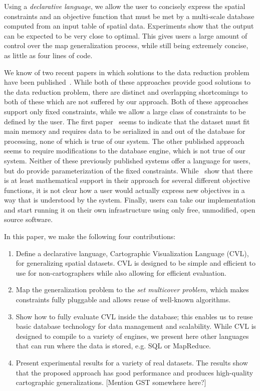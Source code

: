 Using a \emph{declarative language}, we allow the user to concisely express the spatial constraints and an objective function that must be met by a multi-scale database computed from an input table of spatial data. Experiments show that the output can be expected to be very close to optimal. This gives users a large amount of control over the map generalization process, while still being extremely concise, as little as four lines of code.

We know of two recent papers in which solutions to the data reduction problem have been published~\cite{nutanong2012multiresolution,sarma2012fusiontables}. While both of these approaches provide good solutions to the data reduction problem, there are distinct and overlapping shortcomings to both of these which are not suffered by our approach.  Both of these approaches support only fixed constraints, while we allow a large class of constraints to be defined by the user. The first paper~\cite{sarma2012fusiontables} seems to indicate that the dataset must fit main memory and requires data to be serialized in and out of the database for processing, none of which is true of our system. The other published approach~\cite{nutanong2012multiresolution} seems to require modifications to the database engine, which is not true of our system. Neither of these previously published systems offer a language for users, but do provide parameterization of the fixed constraints. While~\cite{sarma2012fusiontables} show that there is at least mathematical support in their approach for several different objective functions, it is not clear how a user would actually express new objectives in a way that is understood by the system. Finally, users can take our implementation and start running it on their own infrastructure using only free, unmodified, open source software.

In this paper, we make the following four contributions:
\begin{enumerate}
\item Define a declarative language, Cartographic Visualization Language (CVL), for generalizing spatial datasets. CVL is designed to be simple and efficient to use for non-cartographers while also allowing for efficient evaluation.

\item Map the generalization problem to the \emph{set multicover problem}, which makes constraints fully pluggable and allows reuse of well-known algorithms.

\item Show how to fully evaluate CVL inside the database; this enables us to reuse basic database technology for data management and scalability. While CVL is designed to compile to a variety of engines, we present here other languages that can run where the data is stored, e.g. SQL or MapReduce.

\item Present experimental results for a variety of real datasets. The results show that the proposed approach has good performance and produces high-quality cartographic generalizations. [Mention GST somewhere here?] 
\end{enumerate}

